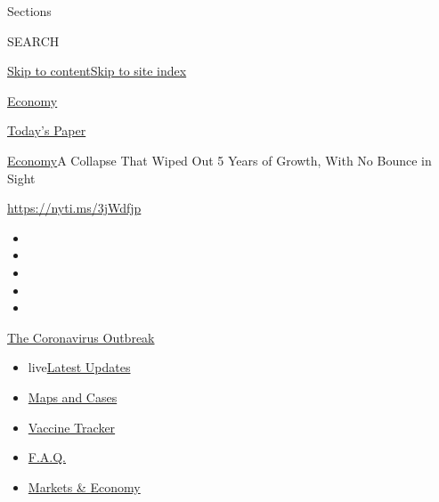 Sections

SEARCH

\protect\hyperlink{site-content}{Skip to
content}\protect\hyperlink{site-index}{Skip to site index}

\href{https://www.nytimes.com/section/business/economy}{Economy}

\href{https://myaccount.nytimes.com/auth/login?response_type=cookie\&client_id=vi}{}

\href{https://www.nytimes.com/section/todayspaper}{Today's Paper}

\href{/section/business/economy}{Economy}\textbar{}A Collapse That Wiped
Out 5 Years of Growth, With No Bounce in Sight

\href{https://nyti.ms/3jWdfjp}{https://nyti.ms/3jWdfjp}

\begin{itemize}
\item
\item
\item
\item
\item
\end{itemize}

\href{https://www.nytimes.com/news-event/coronavirus?action=click\&pgtype=Article\&state=default\&region=TOP_BANNER\&context=storylines_menu}{The
Coronavirus Outbreak}

\begin{itemize}
\tightlist
\item
  live\href{https://www.nytimes.com/2020/08/08/world/coronavirus-updates.html?action=click\&pgtype=Article\&state=default\&region=TOP_BANNER\&context=storylines_menu}{Latest
  Updates}
\item
  \href{https://www.nytimes.com/interactive/2020/us/coronavirus-us-cases.html?action=click\&pgtype=Article\&state=default\&region=TOP_BANNER\&context=storylines_menu}{Maps
  and Cases}
\item
  \href{https://www.nytimes.com/interactive/2020/science/coronavirus-vaccine-tracker.html?action=click\&pgtype=Article\&state=default\&region=TOP_BANNER\&context=storylines_menu}{Vaccine
  Tracker}
\item
  \href{https://www.nytimes.com/interactive/2020/world/coronavirus-tips-advice.html?action=click\&pgtype=Article\&state=default\&region=TOP_BANNER\&context=storylines_menu}{F.A.Q.}
\item
  \href{https://www.nytimes.com/live/2020/08/07/business/stock-market-today-coronavirus?action=click\&pgtype=Article\&state=default\&region=TOP_BANNER\&context=storylines_menu}{Markets
  \& Economy}
\end{itemize}

